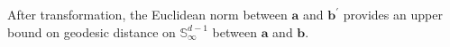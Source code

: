     After transformation, the Euclidean norm between $\bm{a}$ and 
    $\bm{b}^{\prime}$ provides an upper bound on geodesic distance on 
    $\mathbb{S}_{\infty}^{d-1}$ between $\bm{a}$ and $\bm{b}$.



